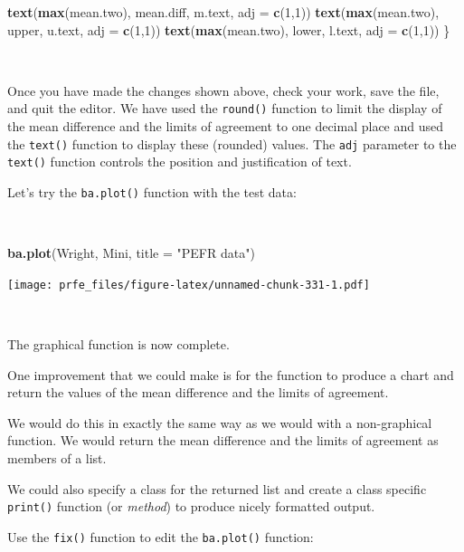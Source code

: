 \documentclass[12pt,a4paper]{book}
\newenvironment{Shaded}{\begin{snugshade}}{\end{snugshade}}
\newcommand{\KeywordTok}[1]{\textcolor[rgb]{0.13,0.29,0.53}{\textbf{#1}}}
\newcommand{\DataTypeTok}[1]{\textcolor[rgb]{0.13,0.29,0.53}{#1}}
\newcommand{\DecValTok}[1]{\textcolor[rgb]{0.00,0.00,0.81}{#1}}
\newcommand{\StringTok}[1]{\textcolor[rgb]{0.31,0.60,0.02}{#1}}
\newcommand{\NormalTok}[1]{#1}
\theoremstyle{definition}
\theoremstyle{definition}
\theoremstyle{definition}
\theoremstyle{remark}
\begin{document}
\begin{Shaded}
\begin{Highlighting}[]
  \KeywordTok{text}\NormalTok{(}\KeywordTok{max}\NormalTok{(mean.two), mean.diff, m.text, }\DataTypeTok{adj =} \KeywordTok{c}\NormalTok{(}\DecValTok{1}\NormalTok{,}\DecValTok{1}\NormalTok{)) }
  \KeywordTok{text}\NormalTok{(}\KeywordTok{max}\NormalTok{(mean.two), upper, u.text, }\DataTypeTok{adj =} \KeywordTok{c}\NormalTok{(}\DecValTok{1}\NormalTok{,}\DecValTok{1}\NormalTok{)) }
  \KeywordTok{text}\NormalTok{(}\KeywordTok{max}\NormalTok{(mean.two), lower, l.text, }\DataTypeTok{adj =} \KeywordTok{c}\NormalTok{(}\DecValTok{1}\NormalTok{,}\DecValTok{1}\NormalTok{))}
\NormalTok{\}}
\end{Highlighting}
\end{Shaded}

~

Once you have made the changes shown above, check your work, save the
file, and quit the editor. We have used the \texttt{round()} function to
limit the display of the mean difference and the limits of agreement to
one decimal place and used the \texttt{text()} function to display these
(rounded) values. The \texttt{adj} parameter to the \texttt{text()}
function controls the position and justification of text.

Let's try the \texttt{ba.plot()} function with the test data:

~

\begin{Shaded}
\begin{Highlighting}[]
\KeywordTok{ba.plot}\NormalTok{(Wright, Mini, }\DataTypeTok{title =} \StringTok{"PEFR data"}\NormalTok{)}
\end{Highlighting}
\end{Shaded}

\texttt{[image: prfe\_files/figure-latex/unnamed-chunk-331-1.pdf]}

~

The graphical function is now complete.

One improvement that we could make is for the function to produce a
chart and return the values of the mean difference and the limits of
agreement.

We would do this in exactly the same way as we would with a
non-graphical function. We would return the mean difference and the
limits of agreement as members of a list.

We could also specify a class for the returned list and create a class
specific \texttt{print()} function (or \emph{method}) to produce nicely
formatted output.

Use the \texttt{fix()} function to edit the \texttt{ba.plot()} function:
\end{document}
